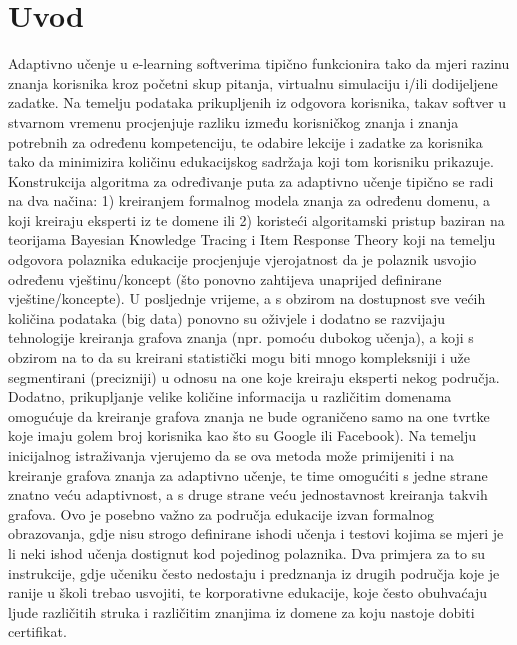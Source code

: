 \chapter{Uvod}
Adaptivno učenje u e-learning softverima tipično funkcionira tako da mjeri razinu znanja korisnika kroz početni skup pitanja, virtualnu simulaciju i/ili dodijeljene zadatke. Na temelju podataka prikupljenih iz odgovora korisnika, takav softver u stvarnom vremenu procjenjuje razliku između korisničkog znanja i znanja potrebnih za određenu kompetenciju, te odabire lekcije i zadatke za korisnika tako da minimizira količinu edukacijskog sadržaja koji tom korisniku prikazuje.\newline
Konstrukcija algoritma za određivanje puta za adaptivno učenje tipično se radi na dva načina: 1) kreiranjem formalnog modela znanja za određenu domenu, a koji kreiraju eksperti iz te domene ili 2) koristeći algoritamski pristup baziran na teorijama Bayesian Knowledge Tracing i Item Response Theory koji na temelju odgovora polaznika edukacije procjenjuje vjerojatnost da je polaznik usvojio određenu vještinu/koncept (što ponovno zahtijeva unaprijed definirane vještine/koncepte).\newline
U posljednje vrijeme, a s obzirom na dostupnost sve većih količina podataka (big data) ponovno su oživjele i dodatno se razvijaju tehnologije kreiranja grafova znanja (npr. pomoću dubokog učenja), a koji s obzirom na to da su kreirani statistički mogu biti mnogo kompleksniji i uže segmentirani (precizniji) u odnosu na one koje kreiraju eksperti nekog područja. Dodatno, prikupljanje velike količine informacija u različitim domenama omogućuje da kreiranje grafova znanja ne bude ograničeno samo na one tvrtke koje imaju golem broj korisnika kao što su Google ili Facebook). Na temelju inicijalnog istraživanja vjerujemo da se ova metoda može primijeniti i na kreiranje grafova znanja za adaptivno učenje, te time omogućiti s jedne strane znatno veću adaptivnost, a s druge strane veću jednostavnost kreiranja takvih grafova.\newline
Ovo je posebno važno za područja edukacije izvan formalnog obrazovanja, gdje nisu strogo definirane ishodi učenja i testovi kojima se mjeri je li neki ishod učenja dostignut kod pojedinog polaznika. Dva primjera za to su instrukcije, gdje učeniku često nedostaju i predznanja iz drugih područja koje je ranije u školi trebao usvojiti, te korporativne edukacije, koje često obuhvaćaju ljude različitih struka i različitim znanjima iz domene za koju nastoje dobiti certifikat.


